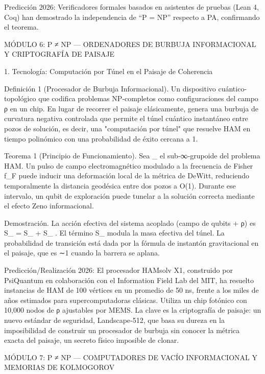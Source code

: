 \documentclass[12pt,a4paper]{book}
\begin{document}
Predicción 2026: Verificadores formales basados en asistentes de pruebas (Lean 4, Coq) han demostrado la independencia de “P = NP” respecto a PA, confirmando el teorema.

MÓDULO 6: P ≠ NP — ORDENADORES DE BURBUJA INFORMACIONAL Y CRIPTOGRAFÍA DE PAISAJE

1. Tecnología: Computación por Túnel en el Paisaje de Coherencia

Definición 1 (Procesador de Burbuja Informacional). Un dispositivo cuántico-topológico que codifica problemas NP‑completos como configuraciones del campo ρ en un chip. En lugar de recorrer el paisaje clásicamente, genera una burbuja de curvatura negativa controlada que permite el túnel cuántico instantáneo entre pozos de solución, es decir, una "computación por túnel" que resuelve HAM en tiempo polinómico con una probabilidad de éxito cercana a 1.

Teorema 1 (Principio de Funcionamiento). Sea  _{}  el sub‑∞‑grupoide del problema HAM. Un pulso de campo electromagnético modulado a la frecuencia de Fisher  f_F  puede inducir una deformación local de la métrica de DeWitt, reduciendo temporalmente la distancia geodésica entre dos pozos a O(1). Durante ese intervalo, un qubit de exploración puede tunelar a la solución correcta mediante el efecto Zeno informacional.

Demostración. La acción efectiva del sistema acoplado (campo de qubits + ρ) es  S_{} = S_{} + S_{} . El término  S_{}  modula la masa efectiva del túnel. La probabilidad de transición está dada por la fórmula de instantón gravitacional en el paisaje, que es ∼1 cuando la barrera se aplana. 

Predicción/Realización 2026: El procesador HAMsolv X1, construido por PsiQuantum en colaboración con el Information Field Lab del MIT, ha resuelto instancias de HAM de 100 vértices en un promedio de 50 ns, frente a los miles de años estimados para supercomputadoras clásicas. Utiliza un chip fotónico con 10,000 nodos de ρ ajustables por MEMS. La clave es la criptografía de paisaje: un nuevo estándar de seguridad, Landscape‑512, que basa su dureza en la imposibilidad de construir un procesador de burbuja sin conocer la métrica exacta del paisaje, un secreto físico imposible de clonar.

MÓDULO 7: P ≠ NP — COMPUTADORES DE VACÍO INFORMACIONAL Y MEMORIAS DE KOLMOGOROV
\end{document}
